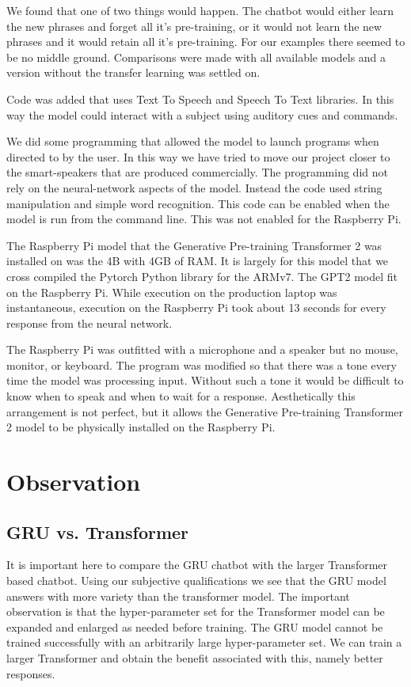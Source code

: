 We found that one of two things would happen. The chatbot would either learn the new phrases and forget all it's pre-training, or it would not learn the new phrases and it would retain all it's pre-training. For our examples there seemed to be no middle ground. Comparisons were made with all available models and a version without the transfer learning was settled on.

Code was added that uses Text To Speech and Speech To Text libraries. In this way the model could interact with a subject using auditory cues and commands.

We did some programming that allowed the model to launch programs when directed to by the user. In this way we have tried to move our project closer to the smart-speakers that are produced commercially. The programming did not rely on the neural-network aspects of the model. Instead the code used string manipulation and simple word recognition. This code can be enabled when the model is run from the command line. This was not enabled for the Raspberry Pi.

The Raspberry Pi model that the Generative Pre-training Transformer 2 was installed on was the 4B with 4GB of RAM. It is largely for this model that we cross compiled the Pytorch Python library for the ARMv7. The GPT2 model fit on the Raspberry Pi. While execution on the production laptop was instantaneous, execution on the Raspberry Pi took about 13 seconds for every response from the neural network.

The Raspberry Pi was outfitted with a microphone and a speaker but no mouse, monitor, or keyboard. The program was modified so that there was a tone every time the model was processing input. Without such a tone it would be difficult to know when to speak and when to wait for a response. Aesthetically this arrangement is not perfect, but it allows the Generative Pre-training Transformer 2 model to be physically installed on the Raspberry Pi.

\section{Observation}

\subsection{GRU vs. Transformer}
It is important here to compare the GRU chatbot with the larger Transformer based chatbot. Using our subjective qualifications we see that the GRU model answers with more variety than the transformer model. The important observation is that the hyper-parameter set for the Transformer model can be expanded and enlarged as needed before training. The GRU model cannot be trained successfully with an arbitrarily large hyper-parameter set. We can train a larger Transformer and obtain the benefit associated with this, namely better responses.

